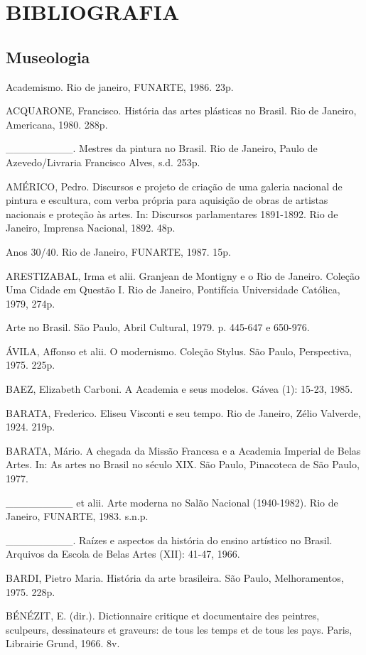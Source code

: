 \section{BIBLIOGRAFIA}

\subsection{Museologia}

Academismo. Rio de janeiro, FUNARTE, 1986. 23p.

ACQUARONE, Francisco. História das artes plásticas no Brasil. Rio de Janeiro, Americana, 1980. 288p.

\_\_\_\_\_\_\_\_\_. Mestres da pintura no Brasil. Rio de Janeiro, Paulo de Azevedo/Livraria Francisco Alves, s.d. 253p.

AMÉRICO, Pedro. Discursos e projeto de criação de uma galeria nacional de pintura e escultura, com verba própria para aquisição de obras de artistas nacionais e proteção às artes. In: Discursos parlamentares 1891-1892. Rio de Janeiro, Imprensa Nacional, 1892. 48p.

Anos 30/40. Rio de Janeiro, FUNARTE, 1987. 15p.

ARESTIZABAL, Irma et alii. Granjean de Montigny e o Rio de Janeiro. Coleção Uma Cidade em Questão I. Rio de Janeiro, Pontifícia Universidade Católica, 1979, 274p.

Arte no Brasil. São Paulo, Abril Cultural, 1979. p. 445-647 e 650-976.

ÁVILA, Affonso et alii. O modernismo. Coleção Stylus. São Paulo, Perspectiva, 1975. 225p.

BAEZ, Elizabeth Carboni. A Academia e seus modelos. Gávea (1): 15-23, 1985.

BARATA, Frederico. Eliseu Visconti e seu tempo. Rio de Janeiro, Zélio Valverde, 1924. 219p.

BARATA, Mário. A chegada da Missão Francesa e a Academia Imperial de Belas Artes. In: As artes no Brasil no século XIX. São Paulo, Pinacoteca de São Paulo, 1977.

\_\_\_\_\_\_\_\_\_ et alii. Arte moderna no Salão Nacional (1940-1982). Rio de Janeiro, FUNARTE, 1983. s.n.p.

\_\_\_\_\_\_\_\_\_. Raízes e aspectos da história do ensino artístico no Brasil. Arquivos da Escola de Belas Artes (XII): 41-47, 1966.

BARDI, Pietro Maria. História da arte brasileira. São Paulo, Melhoramentos, 1975. 228p.

BÉNÉZIT, E. (dir.). Dictionnaire critique et documentaire des peintres, sculpeurs, dessinateurs et graveurs: de tous les temps et de tous les pays. Paris, Librairie Grund, 1966. 8v.

